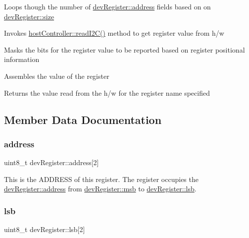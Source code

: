 \begin{DoxyItemize}
\item Loops though the number of \mbox{\hyperlink{classdev_register_ad16fbe9cd26ba1e6d823141976f756da}{dev\+Register\+::address}} fields based on on \mbox{\hyperlink{classdev_register_a6596e86ccbcd857febb5c28bc03aa480}{dev\+Register\+::size}}
\item Invokes \mbox{\hyperlink{classhost_controller_a2bee6b3ec45fac241484f7dad943d8ed}{host\+Controller\+::read\+I2\+C()}} method to get register value from h/w
\item Masks the bits for the register value to be reported based on register positional information
\item Assembles the value of the register
\item Returns the value read from the h/w for the register name specified 
\end{DoxyItemize}

\subsection{Member Data Documentation}
\mbox{\label{classdev_register_ad16fbe9cd26ba1e6d823141976f756da}} 
\subsubsection{\texorpdfstring{address}{address}}
{\footnotesize\ttfamily uint8\+\_\+t dev\+Register\+::address\mbox{[}2\mbox{]}}



This is the A\+D\+D\+R\+E\+SS of this register. The register occupies the \mbox{\hyperlink{classdev_register_ad16fbe9cd26ba1e6d823141976f756da}{dev\+Register\+::address}} from \mbox{\hyperlink{classdev_register_a217b3d5b947f4c596bcdfb4ec175790f}{dev\+Register\+::msb}} to \mbox{\hyperlink{classdev_register_a6908a02139ef85a535848889583e6c12}{dev\+Register\+::lsb}}. 

\mbox{\label{classdev_register_a6908a02139ef85a535848889583e6c12}} 
\subsubsection{\texorpdfstring{lsb}{lsb}}
{\footnotesize\ttfamily uint8\+\_\+t dev\+Register\+::lsb\mbox{[}2\mbox{]}}



